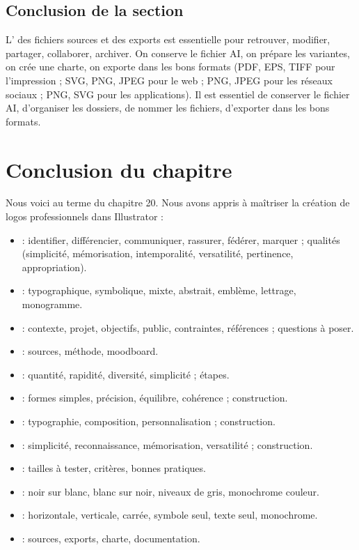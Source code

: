 \subsection*{Conclusion de la section}

L' des fichiers sources et des exports est essentielle pour retrouver, modifier, partager, collaborer, archiver. On conserve le fichier AI, on prépare les variantes, on crée une charte, on exporte dans les bons formats (PDF, EPS, TIFF pour l'impression ; SVG, PNG, JPEG pour le web ; PNG, JPEG pour les réseaux sociaux ; PNG, SVG pour les applications). Il est essentiel de conserver le fichier AI, d'organiser les dossiers, de nommer les fichiers, d'exporter dans les bons formats.

\section*{Conclusion du chapitre}

Nous voici au terme du chapitre 20. Nous avons appris à maîtriser la création de logos professionnels dans Illustrator :

\begin{itemize}
    \item {} : identifier, différencier, communiquer, rassurer, fédérer, marquer ; qualités (simplicité, mémorisation, intemporalité, versatilité, pertinence, appropriation).
    \item {} : typographique, symbolique, mixte, abstrait, emblème, lettrage, monogramme.
    \item {} : contexte, projet, objectifs, public, contraintes, références ; questions à poser.
    \item {} : sources, méthode, moodboard.
    \item {} : quantité, rapidité, diversité, simplicité ; étapes.
    \item {} : formes simples, précision, équilibre, cohérence ; construction.
    \item {} : typographie, composition, personnalisation ; construction.
    \item {} : simplicité, reconnaissance, mémorisation, versatilité ; construction.
    \item {} : tailles à tester, critères, bonnes pratiques.
    \item {} : noir sur blanc, blanc sur noir, niveaux de gris, monochrome couleur.
    \item {} : horizontale, verticale, carrée, symbole seul, texte seul, monochrome.
    \item {} : sources, exports, charte, documentation.
\end{itemize}

